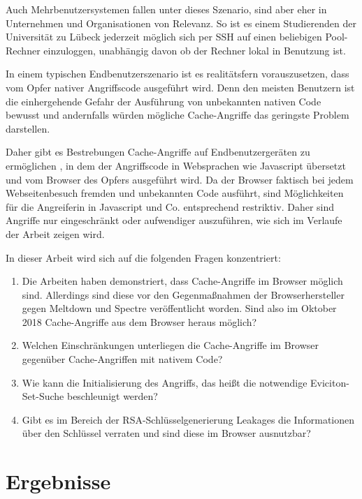 Auch Mehrbenutzersystemen fallen unter dieses Szenario, sind aber eher in Unternehmen und Organisationen von Relevanz.
So ist es einem Studierenden der Universität zu Lübeck jederzeit möglich sich per SSH auf einen beliebigen Pool-Rechner einzuloggen, unabhängig davon ob der Rechner lokal in Benutzung ist.

In einem typischen Endbenutzerszenario ist es realitätsfern vorauszusetzen, dass vom Opfer nativer Angriffscode ausgeführt wird.
Denn den meisten Benutzern ist die einhergehende Gefahr der Ausführung von unbekannten nativen Code bewusst und andernfalls würden mögliche Cache-Angriffe das geringste Problem darstellen.

Daher gibt es Bestrebungen Cache-Angriffe auf Endbenutzergeräten zu ermöglichen \cite{TheSpyInTheSandbox,DriveByPaper,ASLROnTheLine}, in dem der Angriffscode in Websprachen wie Javascript übersetzt und vom Browser des Opfers ausgeführt wird.
Da der Browser faktisch bei jedem Webseitenbesuch fremden und unbekannten Code ausführt, sind Möglichkeiten für die Angreiferin in Javascript und Co. entsprechend restriktiv.
Daher sind Angriffe nur eingeschränkt oder aufwendiger auszuführen, wie sich im Verlaufe der Arbeit zeigen wird. 

In dieser Arbeit wird sich auf die folgenden Fragen konzentriert:

\begin{enumerate}
\item Die Arbeiten \cite{TheSpyInTheSandbox,DriveByPaper,ASLROnTheLine} haben demonstriert, dass Cache-Angriffe im Browser möglich sind. 
Allerdings sind diese vor den Gegenmaßnahmen der Browserhersteller gegen Meltdown und Spectre veröffentlicht worden.
Sind also im Oktober 2018 Cache-Angriffe aus dem Browser heraus möglich?

\item Welchen Einschränkungen unterliegen die Cache-Angriffe im Browser gegenüber Cache-Angriffen mit nativem Code?

\item Wie kann die Initialisierung des Angriffs, das heißt die notwendige Eviciton-Set-Suche beschleunigt werden?

\item Gibt es im Bereich der RSA-Schlüsselgenerierung Leakages die Informationen über den Schlüssel verraten und sind diese im Browser ausnutzbar?
\end{enumerate}

\section{Ergebnisse}

